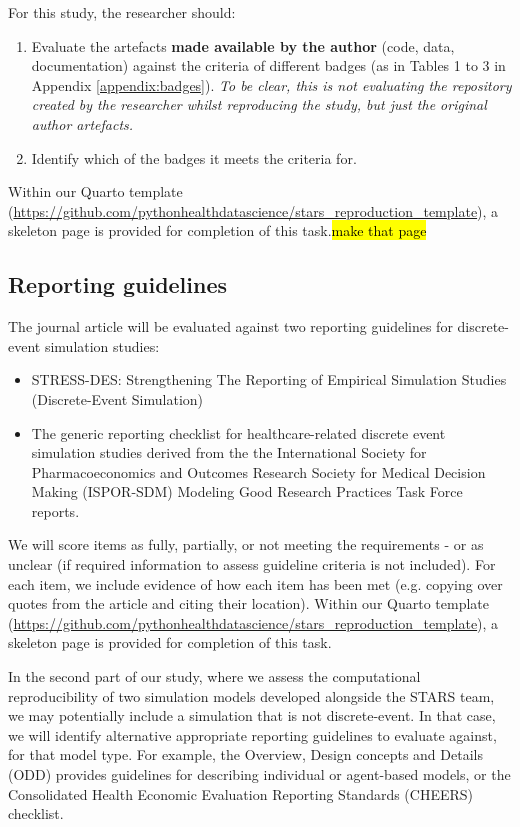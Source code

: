 For this study, the researcher should:
\begin{enumerate}
    \item Evaluate the artefacts \textbf{made available by the author} (code, data, documentation) against the criteria of different badges (as in Tables 1 to 3 in Appendix \ref{appendix:badges}). \textit{To be clear, this is not evaluating the repository created by the researcher whilst reproducing the study, but just the original author artefacts.}
    \item Identify which of the badges it meets the criteria for.
\end{enumerate}

Within our Quarto template (\url{https://github.com/pythonhealthdatascience/stars_reproduction_template}), a skeleton page is provided for completion of this task.\hl{make that page}

\subsection{Reporting guidelines} \label{sec:reporting}

The journal article will be evaluated against two reporting guidelines for discrete-event simulation studies:
\begin{itemize}
    \item STRESS-DES: Strengthening The Reporting of Empirical Simulation Studies (Discrete-Event Simulation)\autocite{monks_strengthening_2019}
    \item The generic reporting checklist for healthcare-related discrete event simulation studies derived from the the International Society for Pharmacoeconomics and Outcomes Research Society for Medical Decision Making (ISPOR-SDM) Modeling Good Research Practices Task Force reports.\autocite{zhang_reporting_2020}
\end{itemize}

We will score items as fully, partially, or not meeting the requirements - or as unclear (if required information to assess guideline criteria is not included). For each item, we include evidence of how each item has been met (e.g. copying over quotes from the article and citing their location). Within our Quarto template (\url{https://github.com/pythonhealthdatascience/stars_reproduction_template}), a skeleton page is provided for completion of this task.

In the second part of our study, where we assess the computational reproducibility of two simulation models developed alongside the STARS team, we may potentially include a simulation that is not discrete-event. In that case, we will identify alternative appropriate reporting guidelines to evaluate against, for that model type. For example, the Overview, Design concepts and Details (ODD) provides guidelines for describing individual or agent-based models,\autocite{grimm_odd_2020} or the Consolidated Health Economic Evaluation Reporting Standards (CHEERS) checklist.\autocite{husereau_consolidated_2013, husereau_consolidated_2013-1}